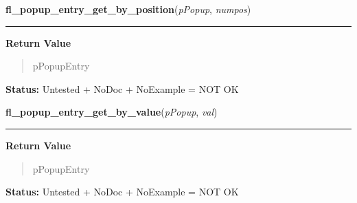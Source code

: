     \label{xformslib:library:fl_popup_entry_get_by_position}

    \vspace{0.5ex}

\hspace{.8\funcindent}\begin{boxedminipage}{\funcwidth}

    \raggedright \textbf{fl\_popup\_entry\_get\_by\_position}(\textit{pPopup}, \textit{numpos})

    \vspace{-1.5ex}

    \rule{\textwidth}{0.5\fboxrule}
\setlength{\parskip}{2ex}
\setlength{\parskip}{1ex}
      \textbf{Return Value}
    \vspace{-1ex}

      \begin{quote}
      pPopupEntry

      \end{quote}

\textbf{Status:} Untested + NoDoc + NoExample = NOT OK



    \end{boxedminipage}

    \label{xformslib:library:fl_popup_entry_get_by_value}

    \vspace{0.5ex}

\hspace{.8\funcindent}\begin{boxedminipage}{\funcwidth}

    \raggedright \textbf{fl\_popup\_entry\_get\_by\_value}(\textit{pPopup}, \textit{val})

    \vspace{-1.5ex}

    \rule{\textwidth}{0.5\fboxrule}
\setlength{\parskip}{2ex}
\setlength{\parskip}{1ex}
      \textbf{Return Value}
    \vspace{-1ex}

      \begin{quote}
      pPopupEntry

      \end{quote}

\textbf{Status:} Untested + NoDoc + NoExample = NOT OK



    \end{boxedminipage}

